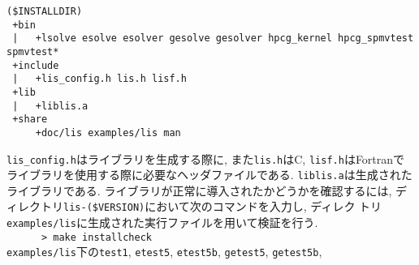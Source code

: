 \documentclass[a4paper]{jarticle}
\begin{document}
\begin{verbatim}
($INSTALLDIR)
 +bin
 |   +lsolve esolve esolver gesolve gesolver hpcg_kernel hpcg_spmvtest spmvtest*
 +include
 |   +lis_config.h lis.h lisf.h
 +lib
 |   +liblis.a
 +share
     +doc/lis examples/lis man
\end{verbatim}
{\tt lis\_config.h}はライブラリを生成する際に, また{\tt lis.h}はC, {\tt lisf.h}はFortranで
ライブラリを使用する際に必要なヘッダファイルである. {\tt liblis.a}は生成された
ライブラリである. 
ライブラリが正常に導入されたかどうかを確認するには, 
ディレクトリ{\tt lis-(\$VERSION)}において次のコマンドを入力し, ディレク
トリ{\tt examples/lis}に生成された実行ファイルを用いて検証を行う. \\
 \verb+      > make installcheck+ \\
{\tt examples/lis}下の{\tt test1}, {\tt etest5}, {\tt etest5b}, {\tt getest5}, {\tt getest5b}, 
\end{document}
